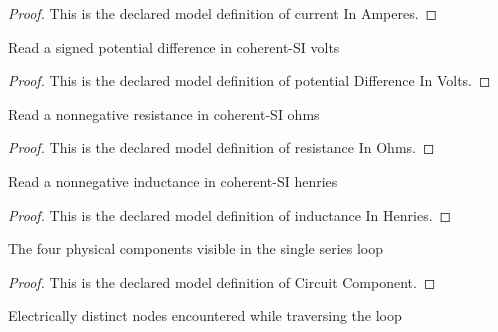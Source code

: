 \begin{proof}
  This is the declared model definition of current In Amperes.
\end{proof}
\begin{definition}
  \label{def:physics:phyx-mini-0882:phyxminiproblems-problemphyxmini0882-potentialdifferenceinvolts}
  Read a signed potential difference in coherent-SI volts
\end{definition}
\begin{proof}
  This is the declared model definition of potential Difference In Volts.
\end{proof}
\begin{definition}
  \label{def:physics:phyx-mini-0882:phyxminiproblems-problemphyxmini0882-resistanceinohms}
  Read a nonnegative resistance in coherent-SI ohms
\end{definition}
\begin{proof}
  This is the declared model definition of resistance In Ohms.
\end{proof}
\begin{definition}
  \label{def:physics:phyx-mini-0882:phyxminiproblems-problemphyxmini0882-inductanceinhenries}
  Read a nonnegative inductance in coherent-SI henries
\end{definition}
\begin{proof}
  This is the declared model definition of inductance In Henries.
\end{proof}
\begin{definition}
  \label{def:physics:phyx-mini-0882:phyxminiproblems-problemphyxmini0882-circuitcomponent}
  The four physical components visible in the single series loop
\end{definition}
\begin{proof}
  This is the declared model definition of Circuit Component.
\end{proof}
\begin{definition}
  \label{def:physics:phyx-mini-0882:phyxminiproblems-problemphyxmini0882-circuitnode}
  Electrically distinct nodes encountered while traversing the loop
\end{definition}
